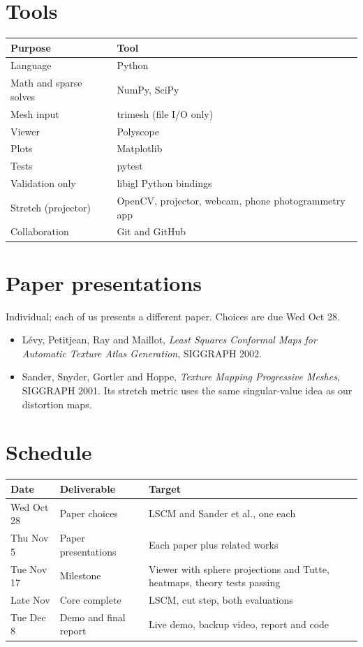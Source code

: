 \documentclass[11pt]{article}
\begin{document}
\section{Tools}
\begin{tabular}{@{}ll@{}}
\toprule
\textbf{Purpose} & \textbf{Tool} \\
\midrule
Language & Python \\
Math and sparse solves & NumPy, SciPy \\
Mesh input & trimesh (file I/O only) \\
Viewer & Polyscope \\
Plots & Matplotlib \\
Tests & pytest \\
Validation only & libigl Python bindings \\
Stretch (projector) & OpenCV, projector, webcam, phone photogrammetry app \\
Collaboration & Git and GitHub \\
\bottomrule
\end{tabular}

\section{Paper presentations}
Individual; each of us presents a different paper. Choices are due Wed Oct 28.
\begin{itemize}
  \item Lévy, Petitjean, Ray and Maillot, \emph{Least Squares Conformal Maps for Automatic Texture Atlas
        Generation}, SIGGRAPH 2002.
  \item Sander, Snyder, Gortler and Hoppe, \emph{Texture Mapping Progressive Meshes}, SIGGRAPH 2001. Its stretch
        metric uses the same singular-value idea as our distortion maps.
\end{itemize}

\section{Schedule}
\begin{tabular}{@{}ll>{\raggedright\arraybackslash}p{7.2cm}@{}}
\toprule
\textbf{Date} & \textbf{Deliverable} & \textbf{Target} \\
\midrule
Wed Oct 28 & Paper choices & LSCM and Sander et al., one each \\
Thu Nov 5  & Paper presentations & Each paper plus related works \\
Tue Nov 17 & Milestone & Viewer with sphere projections and Tutte, heatmaps, theory tests passing \\
Late Nov   & Core complete & LSCM, cut step, both evaluations \\
Tue Dec 8  & Demo and final report & Live demo, backup video, report and code \\
\bottomrule
\end{tabular}
\end{document}
